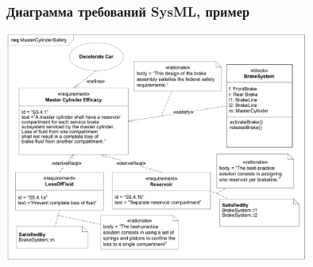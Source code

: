 \documentclass{../cscslides}
\begin{document}
    \begin{frame}
        \frametitle{Диаграмма требований SysML, пример}
        \begin{center}
            \includegraphics[width=0.75\textwidth]{sysMlRequirementsExample.png}
        \end{center}
    \end{frame}
\end{document}
